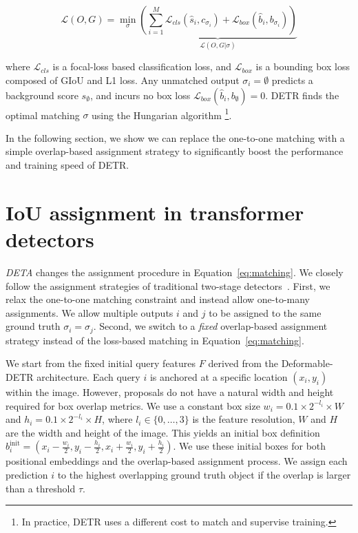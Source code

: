\documentclass[10pt,twocolumn,letterpaper]{article}
\newcommand{\myparagraph}[1]{\vspace{2pt}\noindent{\textbf{#1}}}
\newcommand{\init}{{\text{init}}}
\newcommand{\refeq}[1]{Equation~\eqref{eq:#1}}
\newcommand{\lbleq}[1]{\label{eq:#1}}
\def\name{{\textit{DETA}}\xspace}
\begin{document}
\begin{equation}
 \mathcal{L}(O, G) = \min_\sigma\underbrace{
 \left( \sum_{i=1}^M \mathcal{L}_{cls}(\hat s_i, c_{\sigma_i}) + \mathcal{L}_{box}(\hat b_i, b_{\sigma_i})\right)}
 _{\mathcal{L}(O, G | \sigma)}
 \lbleq{matching}
\end{equation}

where $\mathcal{L}_{cls}$ is a focal-loss based classification loss, and $\mathcal{L}_{box}$ is a bounding box loss composed of GIoU and L1 loss. 
Any unmatched output $\sigma_i = \emptyset$ predicts a background score $s_{\emptyset}$, and incurs no box loss $\mathcal{L}_{box}(\hat b_i, b_\emptyset) = 0$.
DETR finds the optimal matching $\sigma$ using the Hungarian algorithm
\footnote{In practice, DETR uses a different cost to match and supervise training.}.



In the following section, we show we can replace the one-to-one matching with a simple overlap-based assignment strategy to significantly boost the performance and training speed of DETR.


\section{IoU assignment in transformer detectors}

\name changes the assignment procedure in \refeq{matching}.
We closely follow the assignment strategies of traditional two-stage detectors~\cite{ren2015faster}.
First, we relax the one-to-one matching constraint and instead allow one-to-many assignments.
We allow multiple outputs $i$ and $j$ to be assigned to the same ground truth $\sigma_i = \sigma_j$.
Second, we switch to a \emph{fixed} overlap-based assignment strategy instead of the loss-based matching in \refeq{matching}.

\myparagraph{First stage assignments.}
We start from the fixed initial query features $F$ derived from the Deformable-DETR architecture.
Each query $i$ is anchored at a specific location $(x_i,y_i)$ within the image.
However, proposals do not have a natural width and height required for box overlap metrics.
We use a constant box size $w_i = 0.1 \times 2^{-l_i} \times W$ and $h_i = 0.1 \times 2^{-l_i} \times H$, where $l_i \in \{0, \ldots, 3\}$ is the feature resolution, $W$ and $H$ are the width and height of the image.
This yields an initial box definition $b^\init_i = (x_i -\frac{w_i}{2}, y_i -\frac{h_i}{2}, x_i +\frac{w_i}{2}, y_i +\frac{h_i}{2})$.
We use these initial boxes for both positional embeddings and the overlap-based assignment process.
We assign each prediction $i$ to the highest overlapping ground truth object if the overlap is larger than a threshold $\tau$.
\end{document}
